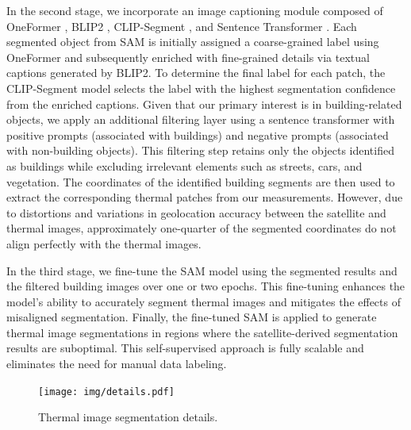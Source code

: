 \documentclass[preprint,12pt]{elsarticle}
\begin{document}
    In the second stage, we incorporate an image captioning module composed of OneFormer \cite{jain2023oneformer}, BLIP2 \cite{li2023blip}, CLIP-Segment \cite{luddecke2022image}, and Sentence Transformer \cite{reimers2019sentence}. Each segmented object from SAM is initially assigned a coarse-grained label using OneFormer and subsequently enriched with fine-grained details via textual captions generated by BLIP2. To determine the final label for each patch, the CLIP-Segment model selects the label with the highest segmentation confidence from the enriched captions. Given that our primary interest is in building-related objects, we apply an additional filtering layer using a sentence transformer with positive prompts (associated with buildings) and negative prompts (associated with non-building objects). This filtering step retains only the objects identified as buildings while excluding irrelevant elements such as streets, cars, and vegetation. The coordinates of the identified building segments are then used to extract the corresponding thermal patches from our measurements. However, due to distortions and variations in geolocation accuracy between the satellite and thermal images, approximately one-quarter of the segmented coordinates do not align perfectly with the thermal images.
    
    In the third stage, we fine-tune the SAM model using the segmented results and the filtered building images over one or two epochs. This fine-tuning enhances the model’s ability to accurately segment thermal images and mitigates the effects of misaligned segmentation. Finally, the fine-tuned SAM is applied to generate thermal image segmentations in regions where the satellite-derived segmentation results are suboptimal. This self-supervised approach is fully scalable and eliminates the need for manual data labeling.
    
       \begin{figure}[h]
            \centering
            \texttt{[image: img/details.pdf]}
            \caption{Thermal image segmentation details.}
            \label{fig:thermseg-details}
        \end{figure}

        
\end{document}
